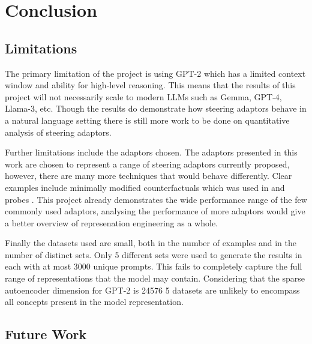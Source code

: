 \chapter{Conclusion}

\section{Limitations}

The primary limitation of the project is using GPT-2 which has a limited context window and ability for high-level reasoning.
This means that the results of this project will not necessarily scale to modern LLMs such as Gemma, GPT-4, Llama-3, etc.
Though the results do demonstrate how steering adaptors behave in a natural language setting there is still more work to be done on quantitative analysis of steering adaptors.

Further limitations include the adaptors chosen.
The adaptors presented in this work are chosen to represent a range of steering adaptors currently proposed, however, there are many more techniques that would behave differently.
Clear examples include minimally modified counterfactuals \citep{mimic} which was used in \citet{steering-clear} and probes \citep{probes}.
This project already demonstrates the wide performance range of the few commonly used adaptors, analysing the performance of more adaptors would give a better overview of represenation engineering as a whole.

Finally the datasets used are small, both in the number of examples and in the number of distinct sets.
Only 5 different sets were used to generate the results in  each with at most 3000 unique prompts.
This fails to completely capture the full range of representations that the model may contain.
Considering that the sparse autoencoder dimension for GPT-2 is 24576 \citep{saelens} 5 datasets are unlikely to encompass all concepts present in the model representation.

\section{Future Work}
